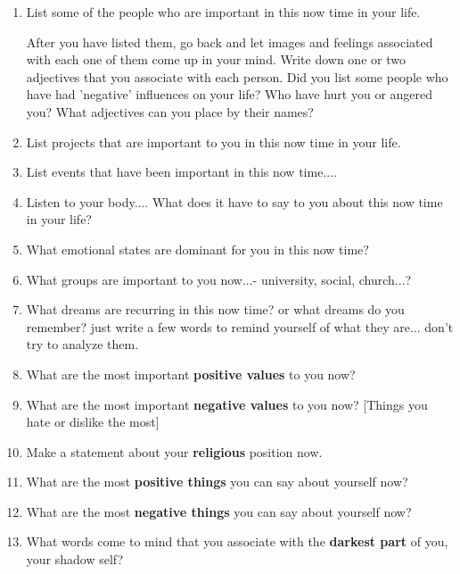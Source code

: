 \begin{enumerate}
	\item List some of the people who are important in this now time in your
 life.

 After you have listed them, go back and let images and feelings
 associated with each one of them come up in your mind. Write down one
 or two adjectives that you associate with each person. Did you list
 some people who have had 'negative' influences on your life? Who have
 hurt you or angered you? What adjectives can you place by their names?

	\item List projects that are important to you in this now time in your life.

	\item List events that have been important in this now time....

	\item Listen to your body.... What does it have to say to you about this now
 time in your life?

	\item What emotional states are dominant for you in this now time?

	\item What groups are important to you now...- university, social, church...?

	\item What dreams are recurring in this now time? or what dreams do you
 remember? just write a few words to remind yourself of what they
 are... don't try to analyze them.

	\item What are the most important \textbf{positive values} to you now?

	\item What are the most important \textbf{negative values} to you now? [Things you
 hate or dislike the most]

	\item Make a statement about your \textbf{religious} position now.

	\item What are the most \textbf{positive things} you can say about yourself now?

	\item What are the most \textbf{negative things} you can say about yourself now?

	\item What words come to mind that you associate with the \textbf{darkest part} of
 you, your shadow self?


\end{enumerate}
